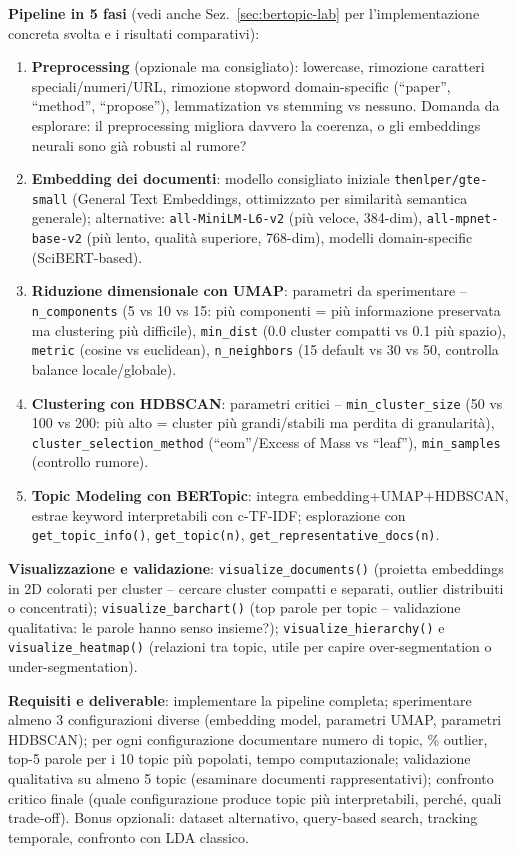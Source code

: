 \documentclass[12pt,a4paper]{article}
\begin{document}
\textbf{Pipeline in 5 fasi} (vedi anche Sez.~\ref{sec:bertopic-lab} per l'implementazione concreta svolta e i risultati comparativi):
\begin{enumerate}
  \item \textbf{Preprocessing} (opzionale ma consigliato): lowercase, rimozione caratteri speciali/numeri/URL, rimozione stopword domain-specific (``paper'', ``method'', ``propose''), lemmatization vs stemming vs nessuno. Domanda da esplorare: il preprocessing migliora davvero la coerenza, o gli embeddings neurali sono gi\`a robusti al rumore?
  \item \textbf{Embedding dei documenti}: modello consigliato iniziale \texttt{thenlper/gte-small} (General Text Embeddings, ottimizzato per similarit\`a semantica generale); alternative: \texttt{all-MiniLM-L6-v2} (pi\`u veloce, 384-dim), \texttt{all-mpnet-base-v2} (pi\`u lento, qualit\`a superiore, 768-dim), modelli domain-specific (SciBERT-based).
  \item \textbf{Riduzione dimensionale con UMAP}: parametri da sperimentare -- \texttt{n\_components} (5 vs 10 vs 15: pi\`u componenti = pi\`u informazione preservata ma clustering pi\`u difficile), \texttt{min\_dist} (0.0 cluster compatti vs 0.1 pi\`u spazio), \texttt{metric} (cosine vs euclidean), \texttt{n\_neighbors} (15 default vs 30 vs 50, controlla balance locale/globale).
  \item \textbf{Clustering con HDBSCAN}: parametri critici -- \texttt{min\_cluster\_size} (50 vs 100 vs 200: pi\`u alto = cluster pi\`u grandi/stabili ma perdita di granularit\`a), \texttt{cluster\_selection\_method} (``eom''/Excess of Mass vs ``leaf''), \texttt{min\_samples} (controllo rumore).
  \item \textbf{Topic Modeling con BERTopic}: integra embedding+UMAP+HDBSCAN, estrae keyword interpretabili con c-TF-IDF; esplorazione con \texttt{get\_topic\_info()}, \texttt{get\_topic(n)}, \texttt{get\_representative\_docs(n)}.
\end{enumerate}

\textbf{Visualizzazione e validazione}: \texttt{visualize\_documents()} (proietta embeddings in 2D colorati per cluster -- cercare cluster compatti e separati, outlier distribuiti o concentrati); \texttt{visualize\_barchart()} (top parole per topic -- validazione qualitativa: le parole hanno senso insieme?); \texttt{visualize\_hierarchy()} e \texttt{visualize\_heatmap()} (relazioni tra topic, utile per capire over-segmentation o under-segmentation).

\textbf{Requisiti e deliverable}: implementare la pipeline completa; sperimentare almeno 3 configurazioni diverse (embedding model, parametri UMAP, parametri HDBSCAN); per ogni configurazione documentare numero di topic, \% outlier, top-5 parole per i 10 topic pi\`u popolati, tempo computazionale; validazione qualitativa su almeno 5 topic (esaminare documenti rappresentativi); confronto critico finale (quale configurazione produce topic pi\`u interpretabili, perch\'e, quali trade-off). Bonus opzionali: dataset alternativo, query-based search, tracking temporale, confronto con LDA classico.
\end{document}
